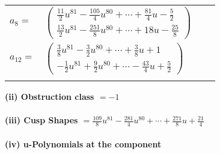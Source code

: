 \documentclass[1p]{elsarticle_modified}
\theoremstyle{definition}
\begin{document}
\begin{tabular}{m{7pt} m{180pt} m{7pt} m{180pt} }
\flushright $a_{8}=$&$\begin{pmatrix}\frac{11}{2} u^{81}-\frac{105}{4} u^{80}+\cdots+\frac{81}{4} u-\frac{5}{2}\\\frac{13}{2} u^{81}-\frac{251}{8} u^{80}+\cdots+18 u-\frac{25}{8}\end{pmatrix}$ \\
\flushright $a_{12}=$&$\begin{pmatrix}\frac{3}{8} u^{81}-\frac{3}{2} u^{80}+\cdots+\frac{3}{8} u+1\\-\frac{1}{2} u^{81}+\frac{9}{2} u^{80}+\cdots-\frac{43}{4} u+\frac{5}{2}\end{pmatrix}$\\&\end{tabular}
\flushleft \textbf{(ii) Obstruction class $= -1$}\\~\\
\flushleft \textbf{(iii) Cusp Shapes $= \frac{109}{8} u^{81}-\frac{281}{4} u^{80}+\cdots+\frac{271}{8} u+\frac{21}{4}$}\\~\\
\newpage\renewcommand{\arraystretch}{1}
\flushleft \textbf{(iv) u-Polynomials at the component}\newline \\
\end{document}
